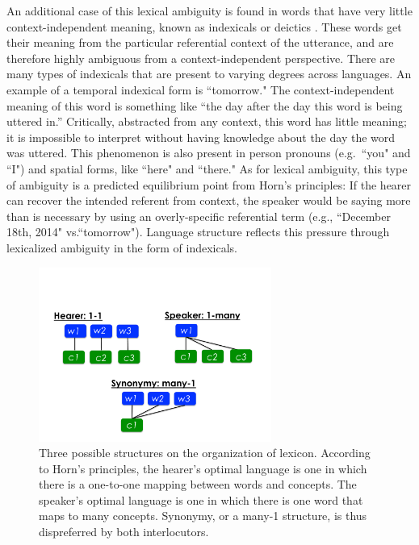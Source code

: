 \documentclass[man, noapacite, 12pt]{apa2}
\begin{document}
An additional case of this lexical ambiguity is found in words that have very little context-independent meaning, known as indexicals or deictics \cite{frawley2003international}. These words get their meaning from the particular referential context of the utterance, and are therefore highly ambiguous from a context-independent perspective. There are many types of indexicals that are present to varying degrees across languages. An example of a temporal indexical form is ``tomorrow." The context-independent meaning of this word is something like ``the day after the day this word is being uttered in.'' Critically, abstracted from any context, this word has little meaning; it is impossible to interpret without having knowledge about the day the word was uttered. This phenomenon is also present in person pronouns (e.g.\ ``you" and ``I") and spatial forms, like ``here" and ``there."  As for lexical ambiguity, this type of ambiguity is a predicted equilibrium point from Horn's principles: If the hearer can recover the intended referent from context, the speaker would be saying more than is necessary by using an overly-specific referential term (e.g., ``December 18th, 2014" vs.``tomorrow"). Language structure reflects this pressure through lexicalized ambiguity in the form of indexicals.

\begin{figure}
\begin{center} 
\includegraphics[width=3in]{figs/onetoone.pdf}
\caption{\label{fig:frank2012} Three possible structures on the organization of lexicon. According to Horn's principles, the hearer's optimal language is one in which there is a one-to-one mapping between words and concepts. The speaker's optimal language is one in which there is one word that maps to many concepts. Synonymy, or a many-1 structure, is thus dispreferred by both interlocutors.}
\end{center} 
\end{figure}
\end{document}
